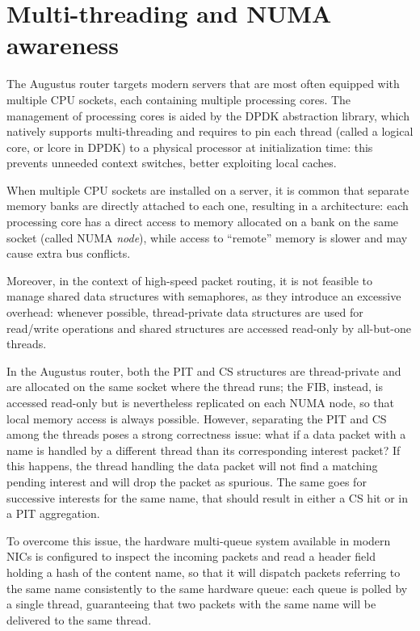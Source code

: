 \documentclass[11pt,a4paper,twoside,titlepage,openany]{book}
\newcommand{\mono}[1]{{\footnotesize \ttfamily #1}}
\begin{document}
\section{Multi-threading and NUMA awareness}\label{sec:augustus.numa}
The Augustus router targets modern servers that are most often equipped with multiple CPU sockets, each containing multiple processing cores. The management of processing cores is aided by the DPDK abstraction library, which natively supports multi-threading and requires to pin each thread (called a logical core, or \mono{lcore} in DPDK) to a physical processor at initialization time: this prevents unneeded context switches, better exploiting local caches.

When multiple CPU sockets are installed on a server, it is common that separate memory banks are directly attached to each one, resulting in a  architecture: each processing core has a direct access to memory allocated on a bank on the same socket (called NUMA \emph{node}), while access to ``remote'' memory is slower and may cause extra bus conflicts.

Moreover, in the context of high-speed packet routing, it is not feasible to manage shared data structures with semaphores, as they introduce an excessive overhead: whenever possible, thread-private data structures are used for read/write operations and shared structures are accessed read-only by all-but-one threads.

In the Augustus router, both the \gls{PIT} and \gls{CS} structures are thread-private and are allocated on the same socket where the thread runs; the \gls{FIB}, instead, is accessed read-only but is nevertheless replicated on each NUMA node, so that local memory access is always possible.
However, separating the \gls{PIT} and \gls{CS} among the threads poses a strong correctness issue: what if a data packet with a name is handled by a different thread than its corresponding interest packet? If this happens, the thread handling the data packet will not find a matching pending interest and will drop the packet as spurious. The same goes for successive interests for the same name, that should result in either a CS hit or in a PIT aggregation.

To overcome this issue, the hardware multi-queue system available in modern NICs is configured to inspect the incoming packets and read a header field holding a hash of the content name, so that it will dispatch packets referring to the same name consistently to the same hardware queue: each queue is polled by a single thread, guaranteeing that two packets with the same name will be delivered to the same thread.
\end{document}
